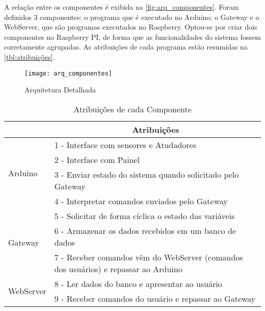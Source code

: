 			A relação entre os componentes é exibida na  \autoref{fig:arq_componentes}. Foram definidos 3 componentes: o programa que é executado no Arduino; o Gateway e o WebServer, que são programas executados no Raspberry. Optou-se por criar dois componentes no Raspberry PI, de forma que as funcionalidades do sistema fossem corretamente agrupadas. As atribuições de cada programa estão resumidas na \autoref{tbl:atribuições}.
			
			\begin{figure}[!htb]	
				\captionsetup{justification=centering}
				\begin{center}
					\texttt{[image: arq\_componentes]}  %
					\caption[Arquitetura Detalhada]{\label{fig:arq_componentes} Arquitetura Detalhada }
				\end{center}		
			\end{figure}
			
			\begin{table}[!htb]
				\centering
				\captionsetup{justification=centering}
				\caption[Atribuições de cada Componente]{Atribuições de cada Componente}
				\label{tbl:atribuições}
				\def\arraystretch{1.3}
				\begin{tabular}{m{2cm}| p{12cm}}
					\hline
					& \multicolumn{1}{c}{\textbf{Atribuições}} \\ \hline
					
					\multirow{4}{*}{Arduino} 
					& 1 - Interface com sensores e Atudadores \\
					& 2 - Interface com Painel \\
					& 3 - Enviar estado do sistema quando solicitado pelo Gateway\\
					& 4 - Interpretar comandos enviados pelo Gateway \\ \hline
					
					\multirow{3}{*}{Gateway} & 5 - Solicitar de forma cíclica o estado das variáveis \\
					& 6 - Armazenar os dados recebidos em um banco de dados \\
					& 7 - Receber comandos vêm do WebServer (comandos dos usuários) e repassar ao Arduino \\ \hline
					
					\multirow{2}{*}{WebServer} & 8 - Ler dados do banco e apresentar ao usuário \\
					& 9 - Receber comandos do usuário e repassar ao Gateway \\
					
					\hline
				\end{tabular}
			\end{table}
		
